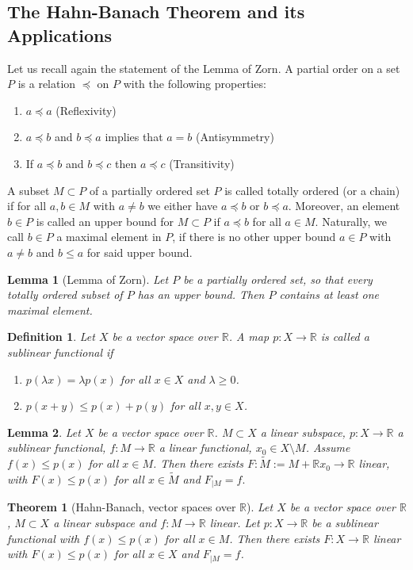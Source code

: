 \documentclass[11pt,a4paper]{article}
\newtheorem{lem}{Lemma}[section]
\newtheorem{thm}{Theorem}[section]
\newtheorem{defn}{Definition}[section]
\theoremstyle{definition}
\begin{document}
\subsection{The Hahn-Banach Theorem and its Applications}
Let us recall again the statement of the Lemma of Zorn. A partial order on a set $P$ is a relation $\preceq$ on $P$ with the following properties: 
\begin{enumerate}
\item $a \preceq a$ (Reflexivity)
\item $a \preceq b$ and $b \preceq a$ implies that $a=b$ (Antisymmetry)
\item If $a \preceq b$ and $b \preceq c$ then $a \preceq c$ (Transitivity)
\end{enumerate}
A subset $M \subset P$ of a partially ordered set $P$ is called totally ordered (or a chain) if for all $a,b \in M$ with $a \neq b$ we either have $a \preceq b$ or $b \preceq a$. Moreover, an element $b \in P$ is called an upper bound for $M \subset P$ if $a \preceq b$ for all $a \in M$. Naturally, we call $b \in P$ a maximal element in $P$, if there is no other upper bound $a \in P$ with $a \neq b$ and $b \leq a$ for said upper bound. 
\begin{lem}[Lemma of Zorn] Let $P$ be a partially ordered set, so that every totally ordered subset of $P$ has an upper bound. Then $P$ contains at least one maximal element. 
\end{lem}
\begin{defn} Let $X$ be a vector space over $\mathbb{R}$. A map $p: X \to \mathbb{R}$ is called a sublinear functional if 
\begin{enumerate}
\item $p( \lambda x) = \lambda p(x)$ for all $x \in X$ and $ \lambda \geq 0$. 
\item $p(x+y) \leq p(x) + p(y)$ for all $x,y \in X$. 
\end{enumerate}
\end{defn}
\begin{lem} Let $X$ be a vector space over $\mathbb{R}$. $M \subset X$ a linear subspace, $p:X \to \mathbb{R}$ a sublinear functional, $f: M \to \mathbb{R}$ a linear functional, $x_0 \in X \setminus M$. Assume $f(x) \leq p(x)$ for all $x \in M$. Then there exists $F: \widetilde{M}:= M + \mathbb{R}x_0 \to \mathbb{R}$ linear,  with $F(x) \leq p(x)$ for all $x \in \widetilde{M}$ and $F_{ \mid M} = f.$
\end{lem}
\newpage
\begin{thm}[Hahn-Banach, vector spaces over $\mathbb{R}$] Let $X$ be a vector space over $\mathbb{R}$, $M \subset X$ a linear subspace and $f: M \to \mathbb{R}$ linear. Let $p: X \to \mathbb{R}$ be a sublinear functional with $f(x) \leq p(x)$ for all $x \in M$. Then there exists $F: X \to \mathbb{R}$ linear with $F(x) \leq p(x)$ for all $x \in X$ and $F_{ \mid M} = f$. 
\end{thm}
\end{document}
